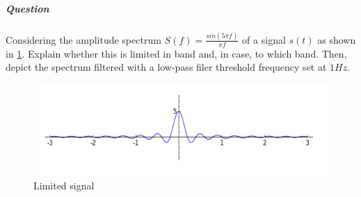 \documentclass[10pt,a4paper]{report}
\theoremstyle{definition}
\begin{document}
\subparagraph{Question}
Considering the amplitude spectrum $S(f) = \frac{sin(5\pi f)}{\pi f}$ of a signal $s(t)$ as shown in \ref{band-signal-eg2}. Explain whether this is limited in band and, in case, to which band. Then, depict the spectrum filtered with a low-pass filer threshold frequency set at $1Hz$.

\begin{figure}[h]
	\centering\includegraphics[scale=0.50]{images/Pasted image 20230531170122.png}
	\caption{Limited signal}
	\label{band-signal-eg2}
	
\end{figure}
\end{document}

